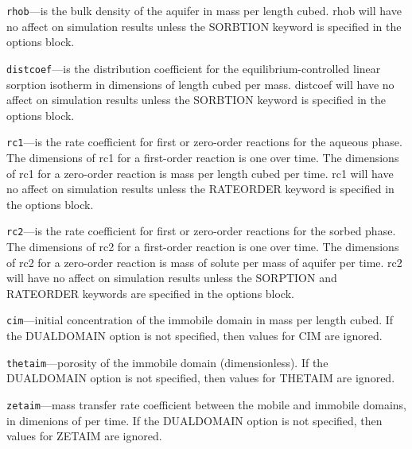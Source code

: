 \begin{description}
\item \texttt{rhob}---is the bulk density of the aquifer in mass per length cubed.  rhob will have no affect on simulation results unless the SORBTION keyword is specified in the options block.

\item \texttt{distcoef}---is the distribution coefficient for the equilibrium-controlled linear sorption isotherm in dimensions of length cubed per mass.  distcoef will have no affect on simulation results unless the SORBTION keyword is specified in the options block.

\item \texttt{rc1}---is the rate coefficient for first or zero-order reactions for the aqueous phase.  The dimensions of rc1 for a first-order reaction is one over time.  The dimensions of rc1 for a zero-order reaction is mass per length cubed per time.  rc1 will have no affect on simulation results unless the RATEORDER keyword is specified in the options block.

\item \texttt{rc2}---is the rate coefficient for first or zero-order reactions for the sorbed phase.  The dimensions of rc2 for a first-order reaction is one over time.  The dimensions of rc2 for a zero-order reaction is mass of solute per mass of aquifer per time.  rc2 will have no affect on simulation results unless the SORPTION and RATEORDER keywords are specified in the options block.

\item \texttt{cim}---initial concentration of the immobile domain in mass per length cubed.  If the DUALDOMAIN option is not specified, then values for CIM are ignored.

\item \texttt{thetaim}---porosity of the immobile domain (dimensionless).  If the DUALDOMAIN option is not specified, then values for THETAIM are ignored.

\item \texttt{zetaim}---mass transfer rate coefficient between the mobile and immobile domains, in dimenions of per time.  If the DUALDOMAIN option is not specified, then values for ZETAIM are ignored.

\end{description}

